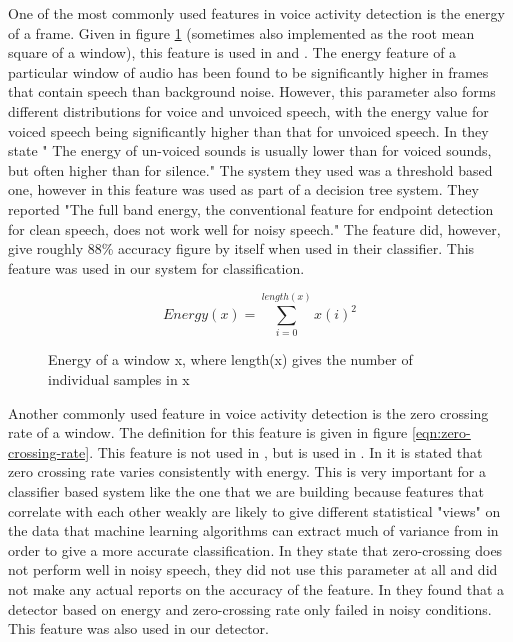 \documentclass[ %
                    author={Sam Phippen},
                supervisor={Dr. Rafal Bogacz},
                     title={Real time voice activity detectors in noisy personal computing environments},
                  subtitle={},
                    degree={MEng},
                      year={2012} ]{thesis}
\begin{document}
One of the most commonly used features in voice activity detection is the
energy of a frame. Given in figure \ref{eqn:energy} (sometimes also implemented
as the root mean square of a window), this feature is used in
\cite{shin}\cite{sakhnov}\cite{gokhun}\cite{haigh}\cite{atal} and \cite{sohn2}.
The energy feature of a particular window of audio has been found to be
significantly higher in frames that contain speech than background
noise\cite{atal}. However, this parameter also forms different distributions
for voice and unvoiced speech, with the energy value for voiced speech being
significantly higher than that for unvoiced speech. In \cite{atal} they state "
The energy of un-voiced sounds is usually lower than for voiced sounds, but
often higher than for silence." The system they used was a threshold based one,
however in \cite{shin} this feature was used as part of a decision tree system.
They reported "The full band energy, the conventional feature for endpoint
detection for clean speech, does not work well for noisy speech." The feature
did, however, give roughly 88\% accuracy figure by itself when used in their
classifier. This feature was used in our system for classification.

\begin{figure}
    $$Energy(x) = \sum_{i=0}^{length(x)}x(i)^2$$
    \label{eqn:energy}
    \caption{Energy of a window x, where length(x) gives the number of individual
    samples in x}
\end{figure}

Another commonly used feature in voice activity detection is the zero crossing
rate of a window. The definition for this feature is given in figure
\ref{eqn:zero-crossing-rate}. This feature is not used in \cite{shin}, but is
used in \cite{atal}. In \cite{atal} it is stated that zero crossing rate varies
consistently with energy. This is very important for a classifier based system
like the one that we are building because features that correlate with each
other weakly are likely to give different statistical "views" on the data that
machine learning algorithms can extract much of variance from in order to give
a more accurate classification. In \cite{shin} they state that zero-crossing
does not perform well in noisy speech, they did not use this parameter at all
and did not make any actual reports on the accuracy of the feature. In
\cite{haigh} they found that a detector based on energy and zero-crossing rate
only failed in noisy conditions. This feature was also used in our detector.
\end{document}
